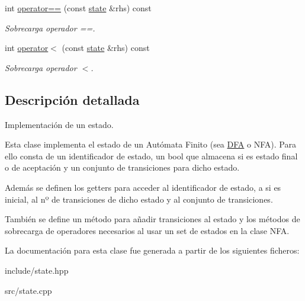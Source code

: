 \begin{DoxyCompactItemize}
int \mbox{\hyperlink{classstate_a11f919a4500e40494d3f24f12e1d0e67}{operator==}} (const \mbox{\hyperlink{classstate}{state}} \&rhs) const
\begin{DoxyCompactList}\small\item\em Sobrecarga operador ==. \end{DoxyCompactList}\item 
\mbox{\label{classstate_a0f39dd40c21202de8607a230d26dbf90}} 
int \mbox{\hyperlink{classstate_a0f39dd40c21202de8607a230d26dbf90}{operator$<$}} (const \mbox{\hyperlink{classstate}{state}} \&rhs) const
\begin{DoxyCompactList}\small\item\em Sobrecarga operador $<$. \end{DoxyCompactList}\end{DoxyCompactItemize}


\subsection{Descripción detallada}
Implementación de un estado. 

Esta clase implementa el estado de un Autómata Finito (sea \mbox{\hyperlink{class_d_f_a}{D\+FA}} o N\+FA). Para ello consta de un identificador de estado, un bool que almacena si es estado final o de aceptación y un conjunto de transiciones para dicho estado.

Además se definen los getters para acceder al identificador de estado, a si es inicial, al nº de transiciones de dicho estado y al conjunto de transiciones.

También se define un método para añadir transiciones al estado y los métodos de sobrecarga de operadores necesarios al usar un set de estados en la clase N\+FA. 

La documentación para esta clase fue generada a partir de los siguientes ficheros\+:\begin{DoxyCompactItemize}
\item 
include/state.\+hpp\item 
src/state.\+cpp\end{DoxyCompactItemize}
